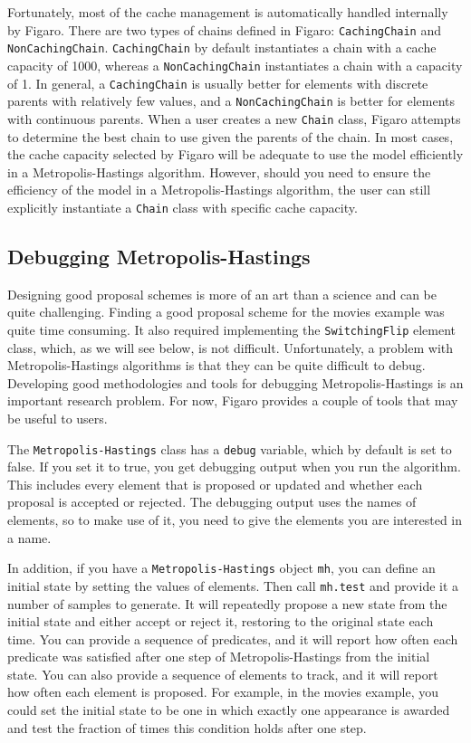Fortunately, most of the cache management is automatically handled internally by Figaro. There are two types of chains defined in Figaro: \texttt{CachingChain} and \texttt{NonCachingChain}. \texttt{CachingChain} by default instantiates a chain with a cache capacity of 1000, whereas a \texttt{NonCachi\-ngChain} instantiates a chain with a capacity of 1. In general, a \texttt{Caching\-Chain} is usually better for elements with discrete parents with relatively few values, and a \texttt{NonCachingChain} is better for elements with continuous parents. When a user creates a new \texttt{Chain} class, Figaro attempts to determine the best chain to use given the parents of the chain. In most cases, the cache capacity selected by Figaro will be adequate to use the model efficiently in a Metropolis-Hastings algorithm. However, should you need to ensure the efficiency of the model in a Metropolis-Hastings algorithm, the user can still explicitly instantiate a \texttt{Chain} class with specific cache capacity.

\subsection{Debugging Metropolis-Hastings}

Designing good proposal schemes is more of an art than a science and can be quite challenging. Finding a good proposal scheme for the movies example was quite time consuming. It also required implementing the \texttt{SwitchingFlip} element class, which, as we will see below, is not difficult. Unfortunately, a problem with Metropolis-Hastings algorithms is that they can be quite difficult to debug. Developing good methodologies and tools for debugging Metropolis-Hastings is an important research problem. For now, Figaro provides a couple of tools that may be useful to users.

The \texttt{Metropolis-Hastings} class has a \texttt{debug} variable, which by default is set to false. If you set it to true, you get debugging output when you run the algorithm. This includes every element that is proposed or updated and whether each proposal is accepted or rejected. The debugging output uses the names of elements, so to make use of it, you need to give the elements you are interested in a name. 

In addition, if you have a \texttt{Metropolis-Hastings} object \texttt{mh}, you can define an initial state by setting the values of elements. Then call \texttt{mh.test} and provide it a number of samples to generate. It will repeatedly propose a new state from the initial state and either accept or reject it, restoring to the original state each time. You can provide a sequence of predicates, and it will report how often each predicate was satisfied after one step of Metropolis-Hastings from the initial state. You can also provide a sequence of elements to track, and it will report how often each element is proposed. For example, in the movies example, you could set the initial state to be one in which exactly one appearance is awarded and test the fraction of times this condition holds after one step.


